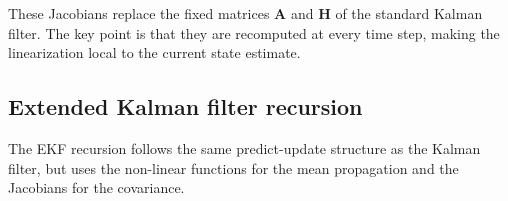 These Jacobians replace the fixed matrices $\mathbf{A}$ and $\mathbf{H}$ of the standard Kalman filter. The key point is that they are recomputed at every time step, making the linearization local to the current state estimate.



\subsection{Extended Kalman filter recursion}
The EKF recursion follows the same predict-update structure as the Kalman filter, but uses the non-linear functions for the mean propagation and the Jacobians for the covariance.

